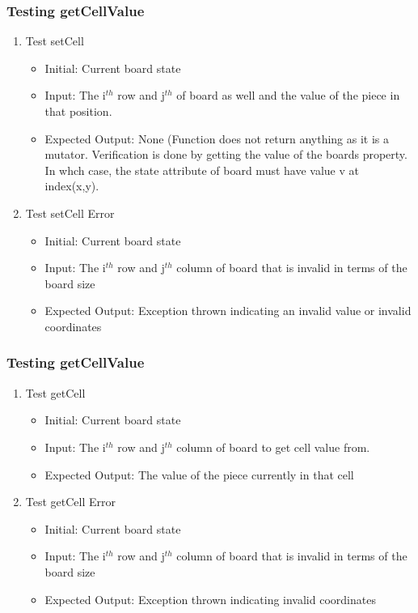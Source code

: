 \documentclass[12pt, titlepage]{article}
\begin{document}
\subsubsection{Testing getCellValue}
\begin{enumerate}
	\item Test setCell \begin{itemize}
		      \item Initial: Current board state
		      \item Input: The i$^{th}$ row and j$^{th}$ of board as well and the value of the piece in that position.
		      \item Expected Output: None (Function does not return anything as it is a mutator. Verification is done by getting the value of the boards property. In whch case, the state attribute of board must have value v at index(x,y).
	      \end{itemize}
	\item Test setCell Error \begin{itemize}
		      \item Initial: Current board state
		      \item Input: The i$^{th}$ row and j$^{th}$ column of board that is invalid in terms of the board size
		      \item Expected Output: Exception thrown indicating an invalid value or invalid coordinates
	      \end{itemize}
\end{enumerate}

\subsubsection{Testing getCellValue}
\begin{enumerate}
	\item Test getCell \begin{itemize}
		      \item Initial: Current board state
		      \item Input: The i$^{th}$ row and j$^{th}$ column of board to get cell value from.
		      \item Expected Output: The value of the piece currently in that cell
	      \end{itemize}
	\item Test getCell Error \begin{itemize}
		      \item Initial: Current board state
		      \item Input: The i$^{th}$ row and j$^{th}$ column of board that is invalid in terms of the board size
		      \item Expected Output: Exception thrown indicating invalid coordinates
	      \end{itemize}
\end{enumerate}
\end{document}
